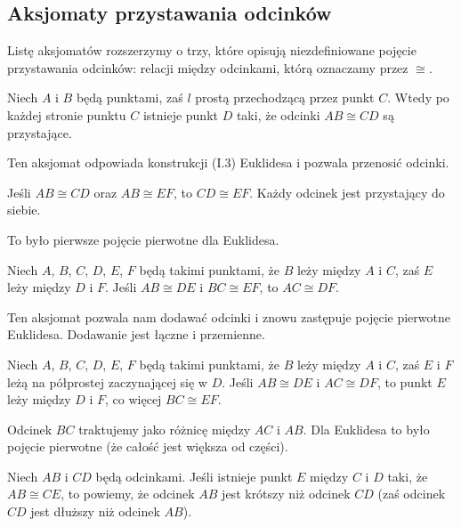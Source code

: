 \subsection{Aksjomaty przystawania odcinków}
Listę aksjomatów rozszerzymy o trzy, które opisują niezdefiniowane pojęcie przystawania odcinków: relacji między odcinkami, którą oznaczamy przez $\cong$.

\begin{axiom}[przystawania, C1]
    Niech $A$ i $B$ będą punktami, zaś $l$ prostą przechodzącą przez punkt $C$.
    Wtedy po każdej stronie punktu $C$ istnieje punkt $D$ taki, że odcinki $AB \cong CD$ są przystające.
\end{axiom}

Ten aksjomat odpowiada konstrukcji (I.3) Euklidesa i pozwala przenosić odcinki.

\begin{axiom}[przystawania, C2]
    Jeśli $AB \cong CD$ oraz $AB \cong EF$, to $CD \cong EF$.
    Każdy odcinek jest przystający do siebie.
\end{axiom}

To było pierwsze pojęcie pierwotne dla Euklidesa.

\begin{axiom}[przystawania, C3]
    Niech $A$, $B$, $C$, $D$, $E$, $F$ będą takimi punktami, że $B$ leży między $A$ i $C$, zaś $E$ leży między $D$ i $F$.
    Jeśli $AB \cong DE$ i $BC \cong EF$, to $AC \cong DF$.
\end{axiom}

Ten aksjomat pozwala nam dodawać odcinki i znowu zastępuje pojęcie pierwotne Euklidesa.
Dodawanie jest łączne i przemienne.

\begin{proposition}
    Niech $A$, $B$, $C$, $D$, $E$, $F$ będą takimi punktami, że $B$ leży między $A$ i $C$, zaś $E$ i $F$ leżą na półprostej zaczynającej się w $D$.
    Jeśli $AB \cong DE$ i $AC \cong DF$, to punkt $E$ leży między $D$ i $F$, co więcej $BC \cong EF$.
\end{proposition}

Odcinek $BC$ traktujemy jako różnicę między $AC$ i $AB$.
Dla Euklidesa to było pojęcie pierwotne (że całość jest większa od części).

\begin{definition}
    Niech $AB$ i $CD$ będą odcinkami.
    Jeśli istnieje punkt $E$ między $C$ i $D$ taki, że $AB \cong CE$, to powiemy, że odcinek $AB$ jest krótszy niż odcinek $CD$ (zaś odcinek $CD$ jest dłuższy niż odcinek $AB$).
\end{definition} %

